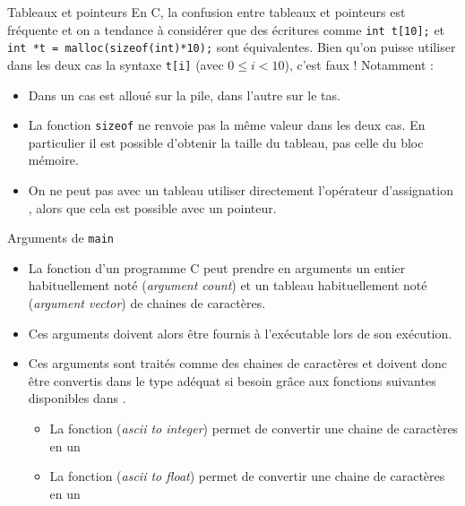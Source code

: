 \documentclass[10pt]{beamer}
\begin{document}
\begin{frame}[fragile]{\Ctitle}{\stitle}
	\begin{block}{Tableaux et pointeurs}
		\textcolor{BrickRed}{\small \danger \;} En C, la confusion entre tableaux et pointeurs est fréquente et on a tendance à considérer que des écritures comme \texttt{int t[10];} et \texttt{int *t = malloc(sizeof(int)*10);} sont équivalentes. Bien qu'on puisse utiliser dans les deux cas la syntaxe \texttt{t[i]} (avec $0\leqslant i < 10$), c'est \textcolor{BrickRed}{faux} ! Notamment   :
		\begin{itemize}
			\item<2-> Dans un cas  est alloué sur la pile, dans l'autre sur le tas.
			\item<3-> La fonction \texttt{sizeof} ne renvoie pas la même valeur dans les deux cas. En particulier il est possible d'obtenir la taille du tableau, pas celle du bloc mémoire.
			\item<4-> On ne peut pas avec un tableau utiliser directement l'opérateur d'assignation \kw{=}, alors que cela est possible avec un pointeur. 
		\end{itemize}
	\end{block}
\end{frame}

\begin{frame}{\Ctitle}{\stitle}
	\begin{block}{Arguments de {\tt main}}
		\begin{itemize}
			\item<1-> La fonction  d'un programme C peut prendre en arguments un entier habituellement noté  (\textit{argument count}) et un tableau habituellement noté  (\textit{argument vector}) de chaines de caractères.
			\item<2-> Ces arguments doivent alors être fournis à l'exécutable lors de son exécution.
			\item<3-> Ces arguments sont traités comme des chaines de caractères et doivent donc être convertis dans le type adéquat si besoin grâce aux fonctions suivantes disponibles dans .
				\begin{itemize}
					\item<4-> La fonction  (\textit{{\sc ascii} to integer}) permet de convertir une chaine de caractères en un 
					\item<5-> La fonction  (\textit{{\sc ascii} to float}) permet de convertir une chaine de caractères en un 
				\end{itemize}

		\end{itemize}
	\end{block}
\end{frame}
\end{document}
